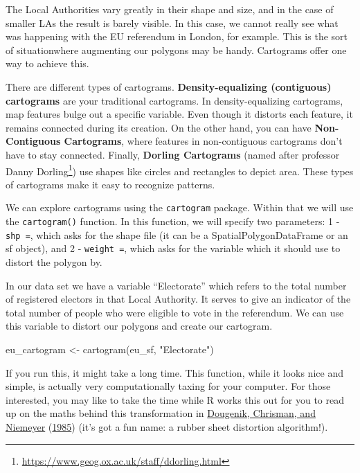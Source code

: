 \documentclass[
]{book}
\makeatletter
\newenvironment{Shaded}{\begin{snugshade}}{\end{snugshade}}
\newcommand{\FunctionTok}[1]{\textcolor[rgb]{0,0,0}{#1}}
\newcommand{\NormalTok}[1]{#1}
\newcommand{\OtherTok}[1]{\textcolor[rgb]{0.37,0.37,0.37}{#1}}
\newcommand{\StringTok}[1]{\textcolor[rgb]{0.5,0.5,0.5}{#1}}
\renewcommand{\href}[2]{#2\footnote{\url{#1}}}
\newenvironment{kframe}{%
\medskip{}
\setlength{\fboxsep}{.8em}
 \def\at@end@of@kframe{}%
 \ifinner\ifhmode%
  \def\at@end@of@kframe{\end{minipage}}%
  \begin{minipage}{\columnwidth}%
 \fi\fi%
 \def\FrameCommand##1{\hskip\@totalleftmargin \hskip-\fboxsep
 \colorbox{shadecolor}{##1}\hskip-\fboxsep
     \hskip-\linewidth \hskip-\@totalleftmargin \hskip\columnwidth}%
 \MakeFramed {\advance\hsize-\width
   \@totalleftmargin\z@ \linewidth\hsize
   \@setminipage}}%
 {\par\unskip\endMakeFramed%
 \at@end@of@kframe}
\renewenvironment{Shaded}{\begin{kframe}}{\end{kframe}}
\makeatother
\begin{document}
The Local Authorities vary greatly in their shape and size, and in the case of smaller LAs the result is barely visible. In this case, we cannot really see what was happening with the EU referendum in London, for example. This is the sort of situationwhere augmenting our polygons may be handy. Cartograms offer one way to achieve this.

There are different types of cartograms. \textbf{Density-equalizing (contiguous) cartograms} are your traditional cartograms. In density-equalizing cartograms, map features bulge out a specific variable. Even though it distorts each feature, it remains connected during its creation. On the other hand, you can have \textbf{Non-Contiguous Cartograms}, where features in non-contiguous cartograms don't have to stay connected. Finally, \textbf{Dorling Cartograms} (named after professor \href{https://www.geog.ox.ac.uk/staff/ddorling.html}{Danny Dorling}) use shapes like circles and rectangles to depict area. These types of cartograms make it easy to recognize patterns.

We can explore cartograms using the \texttt{cartogram} package. Within that we will use the \texttt{cartogram()} function. In this function, we will specify two parameters: 1 - \texttt{shp\ =}, which asks for the shape file (it can be a SpatialPolygonDataFrame or an sf object), and 2 - \texttt{weight\ =}, which asks for the variable which it should use to distort the polygon by.

In our data set we have a variable ``Electorate'' which refers to the total number of registered electors in that Local Authority. It serves to give an indicator of the total number of people who were eligible to vote in the referendum. We can use this variable to distort our polygons and create our cartogram.

\begin{Shaded}
\begin{Highlighting}[]
\NormalTok{eu\_cartogram }\OtherTok{\textless{}{-}} \FunctionTok{cartogram}\NormalTok{(eu\_sf, }\StringTok{"Electorate"}\NormalTok{)}
\end{Highlighting}
\end{Shaded}

If you run this, it might take a long time. This function, while it looks nice and simple, is actually very computationally taxing for your computer. For those interested, you may like to take the time while R works this out for you to read up on the maths behind this transformation in \protect\hyperlink{ref-Dougenik_1985}{Dougenik, Chrisman, and Niemeyer} (\protect\hyperlink{ref-Dougenik_1985}{1985}) (it's got a fun name: a rubber sheet distortion algorithm!).
\end{document}
